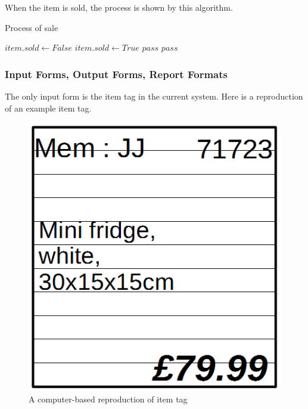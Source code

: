 When the item is sold, the process is shown by this algorithm.

\begin{algorithm}[H]
	\caption{Process of sale}
\begin{algorithmic}[2]
\State $item.sold \gets False$
\EndFunction
{}
\State $item.sold \gets True$
\Else 
\State $pass$
\EndIf
\Else 
\State $pass$
\EndIf
\EndWhile
\end{algorithmic}
\end{algorithm}


\subsubsection{Input Forms, Output Forms, Report Formats}
The only input form is the item tag in the current system. Here is a reproduction of an example item tag.

\begin{figure}[H]
    \includegraphics[width=\textwidth]{./Analysis/ExampleItemTag.png}
    \caption{A computer-based reproduction of item tag} \label{fig:ItemTag}
\end{figure}

